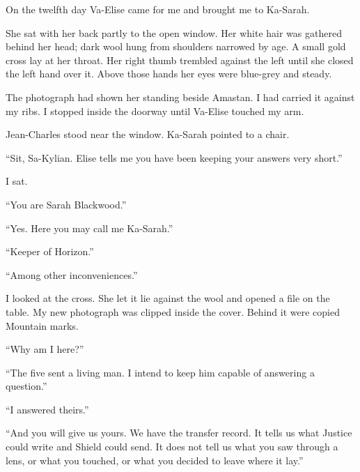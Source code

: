 On the twelfth day Va-Elise came for me and brought me to Ka-Sarah.\par

\ornament

She sat with her back partly to the open window. Her white hair was gathered behind her head; dark wool hung from shoulders narrowed by age. A small gold cross lay at her throat. Her right thumb trembled against the left until she closed the left hand over it. Above those hands her eyes were blue-grey and steady.\par

The photograph had shown her standing beside Amastan. I had carried it against my ribs. I stopped inside the doorway until Va-Elise touched my arm.\par

Jean-Charles stood near the window. Ka-Sarah pointed to a chair.\par

``Sit, Sa-Kylian. Elise tells me you have been keeping your answers very short.''\par

I sat.\par

``You are Sarah Blackwood.''\par

``Yes. Here you may call me Ka-Sarah.''\par

``Keeper of Horizon.''\par

``Among other inconveniences.''\par

I looked at the cross. She let it lie against the wool and opened a file on the table. My new photograph was clipped inside the cover. Behind it were copied Mountain marks.\par

``Why am I here?''\par

``The five sent a living man. I intend to keep him capable of answering a question.''\par

``I answered theirs.''\par

``And you will give us yours. We have the transfer record. It tells us what Justice could write and Shield could send. It does not tell us what you saw through a lens, or what you touched, or what you decided to leave where it lay.''\par

